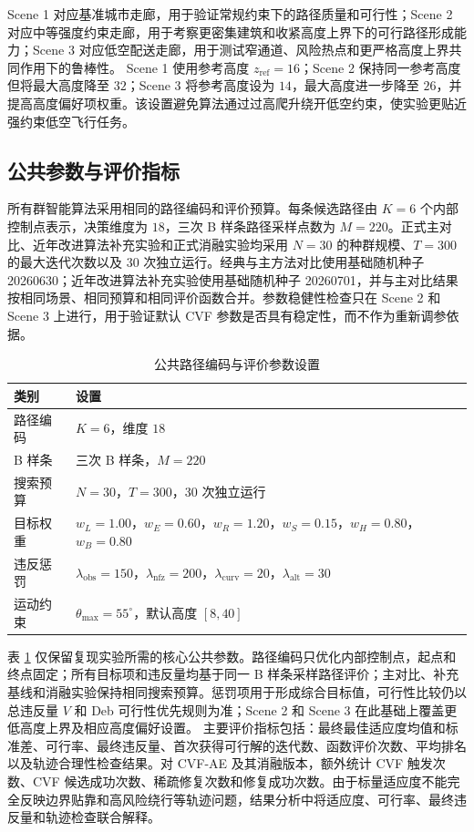 Scene 1 对应基准城市走廊，用于验证常规约束下的路径质量和可行性；Scene 2 对应中等强度约束走廊，用于考察更密集建筑和收紧高度上界下的可行路径形成能力；Scene 3 对应低空配送走廊，用于测试窄通道、风险热点和更严格高度上界共同作用下的鲁棒性。
Scene 1 使用参考高度 $z_{\mathrm{ref}}=16$；Scene 2 保持同一参考高度但将最大高度降至 $32$；Scene 3 将参考高度设为 $14$，最大高度进一步降至 $26$，并提高高度偏好项权重。该设置避免算法通过过高爬升绕开低空约束，使实验更贴近强约束低空飞行任务。

\subsection{公共参数与评价指标}

所有群智能算法采用相同的路径编码和评价预算。每条候选路径由 $K=6$ 个内部控制点表示，决策维度为 $18$，三次 B 样条路径采样点数为 $M=220$。正式主对比、近年改进算法补充实验和正式消融实验均采用 $N=30$ 的种群规模、$T=300$ 的最大迭代次数以及 $30$ 次独立运行。经典与主方法对比使用基础随机种子 20260630；近年改进算法补充实验使用基础随机种子 20260701，并与主对比结果按相同场景、相同预算和相同评价函数合并。参数稳健性检查只在 Scene 2 和 Scene 3 上进行，用于验证默认 CVF 参数是否具有稳定性，而不作为重新调参依据。

\begin{table}[tbp]
\centering
\caption{公共路径编码与评价参数设置}
\label{tab:common-setup}
\small
\begin{tabularx}{\linewidth}{@{}l X@{}}
\toprule
类别 & 设置 \\
\midrule
路径编码 & $K=6$，维度 $18$ \\
B 样条 & 三次 B 样条，$M=220$ \\
搜索预算 & $N=30$，$T=300$，30 次独立运行 \\
目标权重 & $w_L=1.00$，$w_E=0.60$，$w_R=1.20$，$w_S=0.15$，$w_H=0.80$，$w_B=0.80$ \\
违反惩罚 & $\lambda_{\mathrm{obs}}=150$，$\lambda_{\mathrm{nfz}}=200$，$\lambda_{\mathrm{curv}}=20$，$\lambda_{\mathrm{alt}}=30$ \\
运动约束 & $\theta_{\max}=55^\circ$，默认高度 $[8,40]$ \\
\bottomrule
\end{tabularx}
\end{table}

表 \ref{tab:common-setup} 仅保留复现实验所需的核心公共参数。路径编码只优化内部控制点，起点和终点固定；所有目标项和违反量均基于同一 B 样条采样路径评价；主对比、补充基线和消融实验保持相同搜索预算。惩罚项用于形成综合目标值，可行性比较仍以总违反量 $V$ 和 Deb 可行性优先规则为准；Scene 2 和 Scene 3 在此基础上覆盖更低高度上界及相应高度偏好设置。
主要评价指标包括：最终最佳适应度均值和标准差、可行率、最终违反量、首次获得可行解的迭代数、函数评价次数、平均排名以及轨迹合理性检查结果。对 CVF-AE 及其消融版本，额外统计 CVF 触发次数、CVF 候选成功次数、稀疏修复次数和修复成功次数。由于标量适应度不能完全反映边界贴靠和高风险绕行等轨迹问题，结果分析中将适应度、可行率、最终违反量和轨迹检查联合解释。

